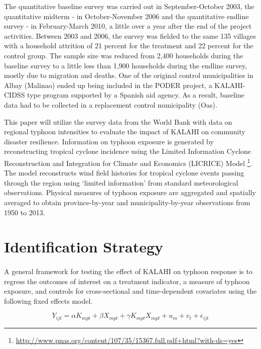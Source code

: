 \documentclass[12pt]{article}
\begin{document}
	The quantitative baseline survey was carried out in September-October 2003, the quantitative midterm - in October-November 2006 and the quantitative endline survey - in February-March 2010, a little over a year after the end of the project activities. Between 2003 and 2006, the survey was fielded to the same 135 villages with a household attrition of 21 percent for the treatment and 22 percent for the control group. The sample size was reduced from 2,400 households during the baseline survey to a little less than 1,900 households during the endline survey, mostly due to migration and deaths. One of the original control municipalities in Albay (Malinao) ended up being included in the PODER project, a KALAHI-CIDSS type program supported by a Spanish aid agency. As a result, baseline data had to be collected in a replacement control municipality (Oas).

	This paper will utilize the survey data from the World Bank with data on regional typhoon intensities to evaluate the impact of KALAHI on community disaster resilience. Information on typhoon exposure is generated by reconstructing tropical cyclone incidence using the Limited Information Cyclone Reconstruction and Integration for Climate and Economics (LICRICE) Model
		\footnote{\url{http://www.pnas.org/content/107/35/15367.full.pdf+html?with-ds=yes}}.
	The model reconstructs wind field histories for tropical cyclone events passing through the region using `limited information' from standard meteorological observations. Physical measures of typhoon exposure are aggregated and spatially averaged to obtain province-by-year and municipality-by-year observations from 1950 to 2013. 


\section{Identification Strategy}
	
	\paragraph{}

	A general framework for testing the effect of KALAHI on typhoon response is to regress the outcomes of interest on a treatment indicator, a measure of typhoon exposure, and controls for cross-sectional and time-dependent covariates using the following fixed effects model.

	\[Y_{ijt} = \alpha K_{mpt} + \beta X_{mpt} + \gamma K_{mpt} X_{mpt} + u_{m} + v_{t} + \epsilon_{ijt}\]
\end{document}

